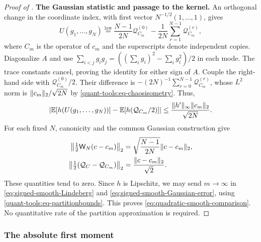 \documentclass[11pt,reqno]{amsart}
\numberwithin{equation}{section}
\theoremstyle{plain}
\theoremstyle{remark}
\DeclarePairedDelimiter{\norm}{\lVert}{\rVert}
\newcommand{\E}{{\mathbb{E}}}
\newcommand{\step}[1]{\par\medskip\noindent\textbf{#1}}
\begin{document}
\begin{proof}[Proof of ]
\step{The Gaussian statistic and passage to the kernel.}
An orthogonal change in the coordinate index, with first vector
$N^{-1/2}(1,\ldots,1)$, gives
\begin{equation}\label{quant-tools:eq-GaussianU}
 U(g_1,\ldots,g_N)\overset{\mathrm{law}}=
 \frac{N-1}{2N}\mathcal Q_{C_m}^{(0)}
 -\frac1{2N}\sum_{r=1}^{N-1}\mathcal Q_{C_m}^{(r)},
\end{equation}
where $C_m$ is the operator of $c_m$ and the superscripts denote independent
copies.  Diagonalize $A$ and use
$\sum_{i<j}g_ig_j=((\sum_i g_i)^2-\sum_i g_i^2)/2$ in each mode.
The trace constants cancel, proving the identity for either sign of $A$.
Couple the right-hand side with $\mathcal Q_{C_m}^{(0)}/2$.
Their difference is $-(2N)^{-1}\sum_{r=0}^{N-1}\mathcal Q_{C_m}^{(r)}$,
whose $L^2$ norm is $\norm{c_m}_2/\sqrt{2N}$ by
\eqref{quant-tools:eq-chaosisometry}.  Thus,
\begin{equation}\label{eq:signed-smooth-Gaussian-error}
 \left|\E[h(U(g_1,\ldots,g_N))]-\E[h(\mathcal Q_{C_m}/2)]\right|
 \leq\frac{\norm{h'}_\infty\norm{c_m}_2}{\sqrt{2N}}.
\end{equation}
For each fixed $N$, canonicity and the common Gaussian construction give
\begin{align}
 \left\|\tfrac12\mathsf W_N(c-c_m)\right\|_2
 &=\sqrt{\frac{N-1}{2N}}\norm{c-c_m}_2,
 \label{eq:signed-kernel-statistic-continuity}\\
 \left\|\tfrac12(\mathcal Q_C-\mathcal Q_{C_m})\right\|_2
 &=\frac{\norm{c-c_m}_2}{\sqrt2}.
 \label{eq:signed-kernel-Gaussian-continuity}
\end{align}
These quantities tend to zero.  Since $h$ is Lipschitz, we may send
$m\to\infty$ in \eqref{eq:signed-smooth-Lindeberg} and
\eqref{eq:signed-smooth-Gaussian-error}, using
\eqref{quant-tools:eq-partitionbounds}.  This proves
\eqref{eq:quadratic-smooth-comparison}.  No quantitative rate of the
partition approximation is required.
\end{proof}

\subsubsection{The absolute first moment}
\label{quant-tools:subsec-absolute-proof}
\end{document}
